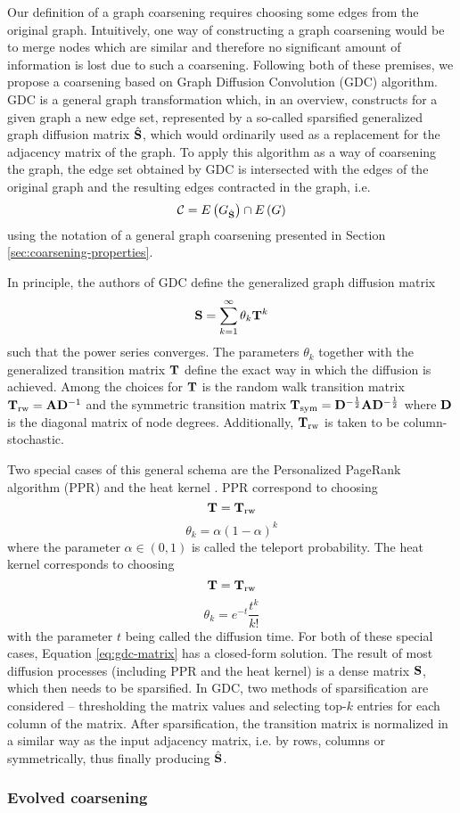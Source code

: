 Our definition of a graph coarsening requires choosing some edges from the original graph. Intuitively, one way of constructing a graph coarsening would be to merge nodes which are similar and therefore no significant amount of information is lost due to such a coarsening. Following both of these premises, we propose a coarsening based on Graph Diffusion Convolution (GDC) \cite{gasteiger_diffusion_2019} algorithm. GDC is a general graph transformation which, in an overview, constructs for a given graph a new edge set, represented by a so-called sparsified generalized graph diffusion matrix \( \hat{\mathbf{S}} \), which would ordinarily used as a replacement for the adjacency matrix of the graph. To apply this algorithm as a way of coarsening the graph, the edge set obtained by GDC is intersected with the edges of the original graph and the resulting edges contracted in the graph, i.e.
\[ \mathcal{C} = E \left( G_{\hat{\mathbf{S}}} \right) \cap E \left( G \right) \]
using the notation of a general graph coarsening presented in Section \ref{sec:coarsening-properties}.

In principle, the authors of GDC define the generalized graph diffusion matrix
\begin{equation}\label{eq:gdc-matrix}
  \mathbf{S} = \sum_{k = 1}^\infty \theta_k \mathbf{T}^k
\end{equation}
such that the power series converges. The parameters \( \theta_k \) together with the generalized transition matrix \( \mathbf{T} \) define the exact way in which the diffusion is achieved. Among the choices for \( \mathbf{T} \) is the random walk transition matrix \( \mathbf{T}_ \mathrm{rw} = \mathbf{A} \mathbf{D}^{-1} \) and the symmetric transition matrix \( \mathbf{T}_\mathrm{sym} = \mathbf{D}^{-\frac{1}{2}} \mathbf{A} \mathbf{D}^{-\frac{1}{2}} \) where \( \mathbf{D} \) is the diagonal matrix of node degrees. Additionally, \( \mathbf{T}_\mathrm{rw} \) is taken to be column-stochastic.

Two special cases of this general schema are the Personalized PageRank algorithm (PPR) \cite{page_pagerank_1999} and the heat kernel \cite{kondor_diffusion_2002}. PPR correspond to choosing
\[ \mathbf{T} = \mathbf{T}_\mathrm{rw} \]
\[ \theta_k = \alpha \left( 1 - \alpha \right)^k \]
where the parameter \( \alpha \in \left( 0, 1 \right) \) is called the teleport probability. The heat kernel corresponds to choosing
\[ \mathbf{T} = \mathbf{T}_\mathrm{rw} \]
\[ \theta_k = e^{-t} \frac{t^k}{k!} \]
with the parameter \( t \) being called the diffusion time. For both of these special cases, Equation \ref{eq:gdc-matrix} has a closed-form solution. The result of most diffusion processes (including PPR and the heat kernel) is a dense matrix \( \mathbf{S} \), which then needs to be sparsified. In GDC, two methods of sparsification are considered -- thresholding the matrix values and selecting top-\( k \) entries for each column of the matrix. After sparsification, the transition matrix is normalized in a similar way as the input adjacency matrix, i.e. by rows, columns or symmetrically, thus finally producing \( \hat{\mathbf{S}} \).

\subsubsection{Evolved coarsening}

